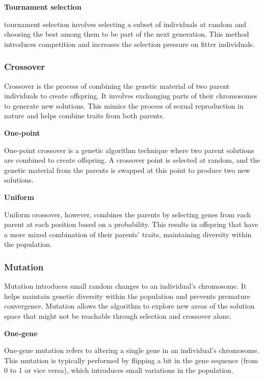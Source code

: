\documentclass[11pt, a4paper]{article}
\begin{document}
\vspace{1em}\textbf{Tournament selection}

tournament selection involves selecting a subset of individuals at random and choosing the best among them to be part of the next generation. This method introduces 
competition and increases the selection pressure on fitter individuals.

\subsubsection{Crossover}

Crossover \cite{WikipediaCrossover} is the process of combining the genetic material of two parent individuals to create offspring. It involves exchanging parts of their 
chromosomes to generate new solutions. This mimics the process of sexual reproduction in nature and helps combine traits from both parents.

\vspace{1em}\textbf{One-point}

One-point crossover is a genetic algorithm technique where two parent solutions are combined to create offspring. A crossover point is selected at random, and the 
genetic material from the parents is swapped at this point to produce two new solutions.

\vspace{1em}\textbf{Uniform}

Uniform crossover, however, combines the parents by selecting genes from each parent at each position based on a probability. This results in offspring that have a more mixed 
combination of their parents' traits, maintaining diversity within the population.

\subsubsection{Mutation}

Mutation \cite{WikipediaMutation} introduces small random changes to an individual’s chromosome. It helps maintain genetic diversity within the population and prevents 
premature convergence. Mutation allows the algorithm to explore new areas of the solution space that might not be reachable through selection and crossover alone.

\vspace{1em}\textbf{One-gene}

One-gene mutation refers to altering a single gene in an individual’s chromosome. This mutation is typically performed by flipping a bit in the gene sequence 
(from 0 to 1 or vice versa), which introduces small variations in the population.
\end{document}
